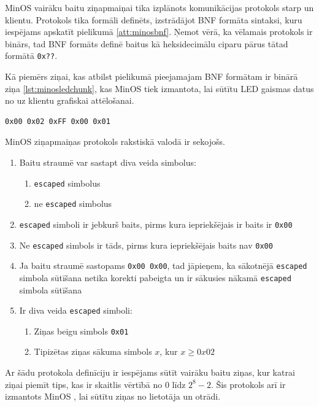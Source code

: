 MinOS  vairāku baitu ziņapmaiņai tika izplānots
komunikācijas protokols starp  un klientu. Protokols
tika formāli definēts, izstrādājot BNF formāta sintaksi, kuru iespējams apskatīt
pielikumā \ref{att:minosbnf}. Ņemot vērā, ka vēlamais protokols ir binārs, tad
BNF formāts definē baitus kā heksidecimālu ciparu pārus tātad formātā
\lstinline!0x??!.

Kā piemērs ziņai, kas atbilst pielikumā pieejamajam BNF formātam ir binārā ziņa
\ref{lst:minosledchunk}, kas MinOS  tiek
izmantota, lai sūtītu LED gaismas datus no  uz
klientu grafiskai attēlošanai.

\begin{lstlisting}[caption={MinOS LED gaismu pakete},label={lst:minosledchunk},captionpos=b]
    0x00 0x02 0xFF 0x00 0x01 
\end{lstlisting}

MinOS ziņapmaiņas protokols rakstiskā valodā ir sekojošs.
\begin{enumerate}
    \item Baitu straumē var sastapt diva veida simbolus:
    \begin{enumerate}
        \item \lstinline!escaped! simbolus
        \item ne \lstinline!escaped! simbolus
    \end{enumerate}
    \item \lstinline!escaped! simboli ir jebkurš baits, pirms kura iepriekšējais ir baits ir \lstinline!0x00!
    \item Ne \lstinline!escaped! simbols ir tāds, pirms kura iepriekšējais baits nav \lstinline!0x00!
    \item Ja baitu straumē sastopams \lstinline!0x00 0x00!, tad jāpieņem, ka
        sākotnējā \lstinline!escaped! simbola sūtīšana netika korekti pabeigta
        un ir sākusies nākamā \lstinline!escaped! simbola sūtīšana
    \item Ir diva veida \lstinline!escaped! simboli: 
    \begin{enumerate}
        \item Ziņas beigu simbols \lstinline!0x01!
        \item Tipizētas ziņas sākuma simbols \(x\), kur \(x\geq0x02\)
    \end{enumerate}
\end{enumerate}

Ar šādu protokola definīciju ir iespējams sūtīt vairāku baitu ziņas, kur katrai
ziņai piemīt tips, kas ir skaitlis vērtībā no \(0\) līdz \(2^8-2\). Šis
protokols arī ir izmantots MinOS , lai sūtītu
ziņas no lietotāja  un otrādi. 

